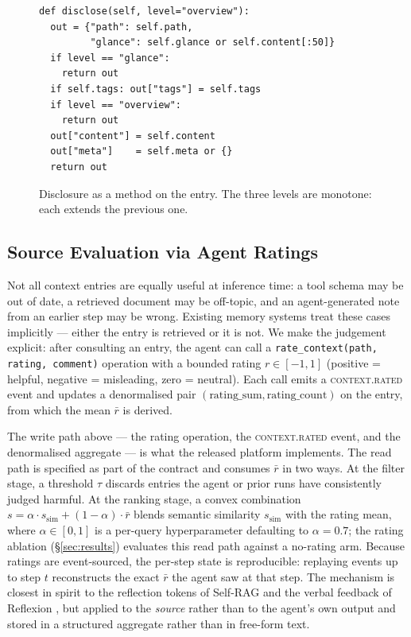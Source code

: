 \begin{figure}[t]
\small
\begin{verbatim}
def disclose(self, level="overview"):
  out = {"path": self.path,
         "glance": self.glance or self.content[:50]}
  if level == "glance":
    return out
  if self.tags: out["tags"] = self.tags
  if level == "overview":
    return out
  out["content"] = self.content
  out["meta"]    = self.meta or {}
  return out
\end{verbatim}
\caption{Disclosure as a method on the entry. The three levels are
monotone: each extends the previous one.}
\label{lst:disclose}
\end{figure}

\subsection{Source Evaluation via Agent Ratings}
\label{sec:component_rating}

Not all context entries are equally useful at inference time: a tool
schema may be out of date, a retrieved document may be off-topic, and an
agent-generated note from an earlier step may be wrong. Existing memory
systems treat these cases implicitly --- either the entry is retrieved or
it is not. We make the judgement explicit: after consulting an entry,
the agent can call a \texttt{rate\_context(path, rating, comment)}
operation with a bounded rating $r \in [-1, 1]$ (positive = helpful,
negative = misleading, zero = neutral). Each call emits a
\textsc{context.rated} event and updates a denormalised pair
$(\text{rating\_sum}, \text{rating\_count})$ on the entry, from which the
mean $\bar r$ is derived.

The write path above --- the rating operation, the
\textsc{context.rated} event, and the denormalised aggregate --- is
what the released platform implements. The read path is specified as
part of the contract and consumes $\bar r$ in two ways. At the filter
stage, a threshold $\tau$ discards entries the agent or prior runs
have consistently judged harmful. At the ranking stage, a convex
combination
$s = \alpha \cdot s_\text{sim} + (1 - \alpha) \cdot \bar r$ blends
semantic similarity $s_\text{sim}$ with the rating mean, where
$\alpha \in [0, 1]$ is a per-query hyperparameter defaulting to
$\alpha = 0.7$; the rating ablation (\S\ref{sec:results}) evaluates
this read path against a no-rating arm.
Because ratings are event-sourced, the per-step state is
reproducible: replaying events up to step $t$ reconstructs the exact
$\bar r$ the agent saw at that step. The mechanism is closest in spirit
to the reflection tokens of Self-RAG \citep{asai2024selfrag} and the
verbal feedback of Reflexion \citep{shinn2023reflexion}, but applied to
the \emph{source} rather than to the agent's own output and stored in
a structured aggregate rather than in free-form text.

